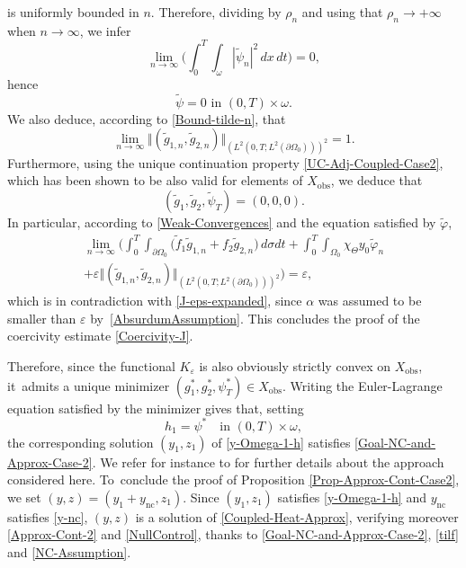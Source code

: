 \documentclass[11pt]{article}
\numberwithin{equation}{section}
\newcommand{\nc}{\mathrm{nc}}
\newcommand{\obs}{\mathrm{obs}}
\newcommand{\norm}[1]{\Vert#1\Vert}
\theoremstyle{definition}
\begin{document}
is uniformly bounded in $n$. Therefore, dividing by $\rho_n$ and using that $\rho_n\to +\infty$ when $n\to \infty$, we infer
\begin{equation*}
\lim_{n \to \infty} \biggl(\int_0^T \int_\omega |\tilde \psi_n|^2 \, dx\,dt \biggr) = 0,
\end{equation*}
hence
\[
\tilde \psi = 0 \text{ in } (0,T) \times \omega.
\]
We also deduce, according to \eqref{Bound-tilde-n}, that
\begin{equation*}
\lim_{n \to \infty} \norm{(\tilde g_{1,n}, \tilde g_{2,n})}_{(L^2(0,T; L^2(\partial\Omega_0)))^2} = 1.
\end{equation*}
Furthermore, using the unique continuation property \eqref{UC-Adj-Coupled-Case2}, which has been shown to be also valid for elements of $X_{\obs}$, we deduce that
\[
(\tilde g_1, \tilde g_2, \tilde \psi_T) = (0,0,0).
\]
In particular, according to \eqref{Weak-Convergences} and the equation satisfied by $\tilde \varphi$,
\begin{multline*}
\lim_{n \to \infty}
\biggl(
\int_0^T \int_{\partial \Omega_0} \bigl(\tilde f_1 \tilde g_{1,n} + f_2 \tilde g_{2,n} \bigr) \, d\sigma dt
+
\int_0^T \int_{\Omega_0} \chi_{\Theta} y_0 \tilde \varphi_n\\[-5pt]
+
\varepsilon
{ \norm{(\tilde g_{1,n}, \tilde g_{2,n})}_{(L^2(0,T; L^2(\partial\Omega_0)))^2}}
\biggr)
=
\varepsilon,
\end{multline*}
which is in contradiction with \eqref{J-eps-expanded}{, since $\alpha$ was assumed to be smaller than $\varepsilon$ by~\eqref{AbsurdumAssumption}}. This concludes the proof of the coercivity estimate \eqref{Coercivity-J}.

Therefore, since the functional $K_\varepsilon$ is also obviously strictly convex on $X_{\obs}$, it~admits a unique minimizer $(g_1^*, g_2^*, \psi_T^*) \in X_{\obs}$. Writing the Euler-Lagrange equation satisfied by the minimizer gives that, setting
\begin{equation*}
h_1 = \psi^* \quad\text{in } (0,T) \times \omega,
\end{equation*}
the corresponding solution $(y_1,z_1)$ of \eqref{y-Omega-1-h} satisfies \eqref{Goal-NC-and-Approx-Case-2}. We refer for instance to \cite[Th.\,1.2 and its proof]{Ervedoza-Note-2020} for further details about the approach considered here. To~conclude the proof of Proposition \ref{Prop-Approx-Cont-Case2}, we set $(y,z)=(y_1+y_{\nc},z_1)$. Since $(y_1,z_1)$ satisfies \eqref{y-Omega-1-h} and $y_{\nc}$ satisfies \eqref{y-nc}, $(y,z)$ is a solution of \eqref{Coupled-Heat-Approx}, verifying moreover \eqref{Approx-Cont-2} and \eqref{NullControl}, thanks to \eqref{Goal-NC-and-Approx-Case-2}, \eqref{tilf} and \eqref{NC-Assumption}.
\end{document}
